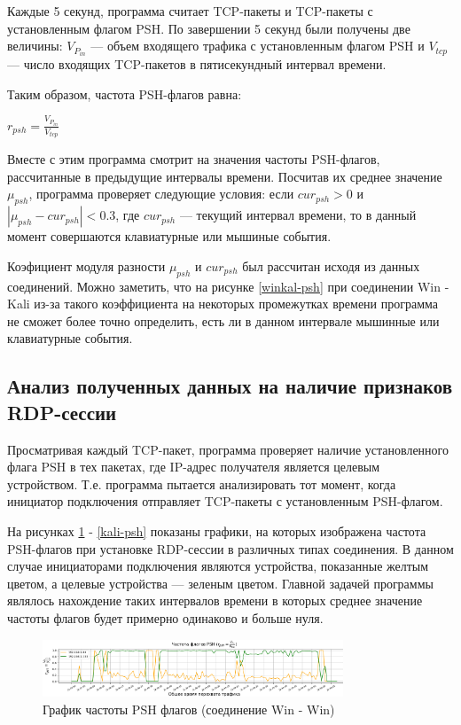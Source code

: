 \documentclass[bachelor, och, coursework]{SCWorks}
\begin{document}
Каждые 5 секунд, программа считает TCP-пакеты и TCP-пакеты с установленным флагом PSH. По завершении
5 секунд были получены две величины: $V_{P_{in}}$ --- объем входящего трафика с установленным флагом PSH и $V_{tcp}$ --- число входящих
TCP-пакетов в пятисекундный интервал времени.

Таким образом, частота PSH-флагов равна:
\begin{center}
  $r_{psh} = \frac{V_{P_{in}}}{V_{tcp}}$
\end{center} 

Вместе с этим программа смотрит на значения частоты PSH-флагов, рассчитанные в предыдущие интервалы времени. Посчитав их среднее значение $\mu_{psh}$,
программа проверяет следующие условия: если $cur_{psh} > 0$ и $| \mu_{psh} - cur_{psh}| < 0.3$, где $cur_{psh}$ --- текущий интервал времени, то 
в данный момент совершаются клавиатурные или мышиные события.

Коэфициент модуля разности $\mu_{psh}$ и $cur_{psh}$ был рассчитан исходя из данных соединений. Можно заметить, что на рисунке \ref{winkal-psh} 
при соединении Win - Kali из-за такого коэффициента на некоторых промежутках времени программа не сможет более точно определить, есть ли в данном интервале мышинные 
или клавиатурные события.


\subsection{Анализ полученных данных на наличие признаков RDP-сессии}

Просматривая каждый TCP-пакет, программа проверяет наличие установленного флага PSH в тех пакетах, где IP-адрес 
получателя является целевым устройством. Т.е. программа пытается анализировать тот момент, когда инициатор подключения
отправляет TCP-пакеты с установленным PSH-флагом.


На рисунках \ref{win-psh} - \ref{kali-psh} показаны графики, на которых изображена частота PSH-флагов при установке RDP-сессии 
в различных типах соединения. В данном случае инициаторами подключения являются устройства, показанные желтым цветом, а целевые устройства --- 
зеленым цветом. Главной задачей программы являлось нахождение таких интервалов времени в которых среднее значение частоты флагов будет примерно
одинаково и больше нуля.

\begin{figure}[H]
  \centering
  \includegraphics[width=0.8\textwidth]{photo/psh-win.png}
  \caption{График частоты PSH флагов (соединение Win - Win)}
  \label{win-psh}
\end{figure}
\end{document}
